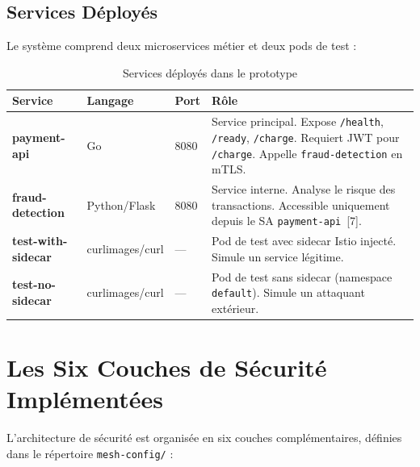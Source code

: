 \subsection{Services Déployés}

Le système comprend deux microservices métier et deux pods de test :

\begin{table}[H]
  \centering
  \caption{Services déployés dans le prototype}
  \label{tab:services_deployes}
  \renewcommand{\arraystretch}{1.4}
  \begin{tabularx}{\textwidth}{
    >{\bfseries}L{3cm} C{2.5cm} C{1.2cm} X
  }
    \toprule
    Service & Langage & Port & Rôle \\
    \midrule
    payment-api
      & Go & 8080
      & Service principal. Expose \texttt{/health}, \texttt{/ready}, \texttt{/charge}.
        Requiert JWT pour \texttt{/charge}. Appelle \texttt{fraud-detection} en mTLS. \\
    fraud-detection
      & Python/Flask & 8080
      & Service interne. Analyse le risque des transactions. Accessible uniquement
        depuis le SA \texttt{payment-api}~[7]. \\
    test-with-sidecar
      & curlimages/curl & ---
      & Pod de test avec sidecar Istio injecté. Simule un service légitime. \\
    test-no-sidecar
      & curlimages/curl & ---
      & Pod de test sans sidecar (namespace \texttt{default}). Simule un attaquant
        extérieur. \\
    \bottomrule
  \end{tabularx}
\end{table}

\section{Les Six Couches de Sécurité Implémentées}
\label{sec:mesh-config}

L'architecture de sécurité est organisée en six couches complémentaires, définies
dans le répertoire \texttt{mesh-config/} :

